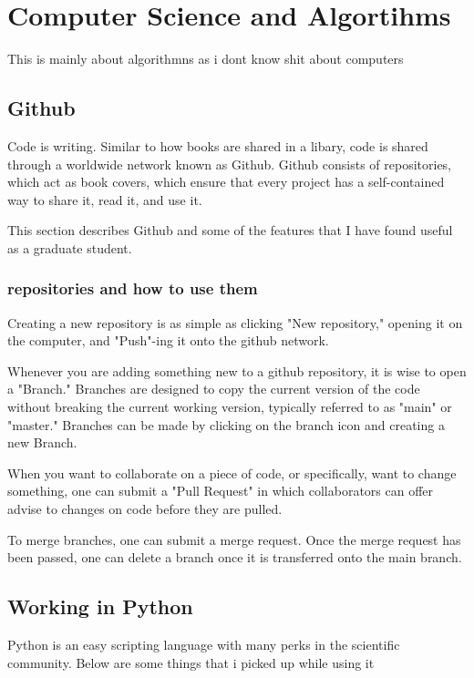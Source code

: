 \chapter{Computer Science and Algortihms}

This is mainly about algorithmns as i dont know shit about computers


\section{Github}

Code is writing. Similar to how books are shared in a libary, code is shared through a worldwide network known as Github. Github consists of repositories, which act as book covers, which ensure that every project has a self-contained way to share it, read it, and use it. 

This section describes Github and some of the features that I have found useful as a graduate student.

\subsection{repositories and how to use them}

Creating a new repository is as simple as clicking "New repository," opening it on the computer, and "Push"-ing it onto the github network. 

Whenever you are adding something new to a github repository, it is wise to open a "Branch." Branches are designed to copy the current version of the code without breaking the current working version, typically referred to as "main" or "master." Branches can be made by clicking on the branch icon and creating a new Branch.

When you want to collaborate on a piece of code, or specifically, want to change something, one can submit a "Pull Request" in which collaborators can offer advise to changes on code before they are pulled.

To merge branches, one can submit a merge request. Once the merge request has been passed, one can delete a branch once it is transferred onto the main branch.

\section{Working in Python}

Python is an easy scripting language with many perks in the scientific community. Below are some things that i picked up while using it

